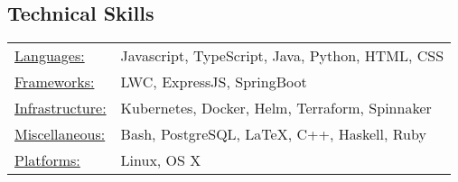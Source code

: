 \documentclass[12pt]{res}
\begin{document}
\begin{resume}
% 

\section{Technical Skills}
\begin{tabular}{l p{4in}}
    \underline{Languages:} & Javascript, TypeScript, Java, Python, HTML, CSS \\
    \underline{Frameworks:} & LWC, ExpressJS, SpringBoot \\
    \underline{Infrastructure:} & Kubernetes, Docker, Helm, Terraform, Spinnaker \\
    \underline{Miscellaneous:} & Bash, PostgreSQL, \LaTeX, C++, Haskell, Ruby \\
    \underline{Platforms:} & Linux, OS X
\end{tabular}

\end{resume}
\end{document}
